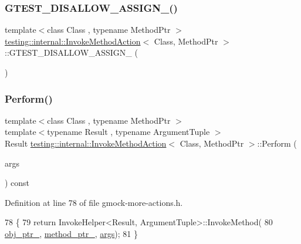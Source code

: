 \subsubsection{\texorpdfstring{G\+T\+E\+S\+T\+\_\+\+D\+I\+S\+A\+L\+L\+O\+W\+\_\+\+A\+S\+S\+I\+G\+N\+\_\+()}{GTEST\_DISALLOW\_ASSIGN\_()}}
{\footnotesize\ttfamily template$<$class Class , typename Method\+Ptr $>$ \\
\hyperlink{classtesting_1_1internal_1_1InvokeMethodAction}{testing\+::internal\+::\+Invoke\+Method\+Action}$<$ Class, Method\+Ptr $>$\+::G\+T\+E\+S\+T\+\_\+\+D\+I\+S\+A\+L\+L\+O\+W\+\_\+\+A\+S\+S\+I\+G\+N\+\_\+ (\begin{DoxyParamCaption}\item[{\hyperlink{classtesting_1_1internal_1_1InvokeMethodAction}{Invoke\+Method\+Action}$<$ Class, Method\+Ptr $>$}]{ }\end{DoxyParamCaption})\hspace{0.3cm}{\ttfamily [private]}}

\mbox{\label{classtesting_1_1internal_1_1InvokeMethodAction_aed6971c668bc2c7671d512306b25b1ab}} 
\subsubsection{\texorpdfstring{Perform()}{Perform()}}
{\footnotesize\ttfamily template$<$class Class , typename Method\+Ptr $>$ \\
template$<$typename Result , typename Argument\+Tuple $>$ \\
Result \hyperlink{classtesting_1_1internal_1_1InvokeMethodAction}{testing\+::internal\+::\+Invoke\+Method\+Action}$<$ Class, Method\+Ptr $>$\+::Perform (\begin{DoxyParamCaption}\item[{const Argument\+Tuple \&}]{args }\end{DoxyParamCaption}) const\hspace{0.3cm}{\ttfamily [inline]}}



Definition at line 78 of file gmock-\/more-\/actions.\+h.


\begin{DoxyCode}
78                                                   \{
79     \textcolor{keywordflow}{return} InvokeHelper<Result, ArgumentTuple>::InvokeMethod(
80         \hyperlink{classtesting_1_1internal_1_1InvokeMethodAction_ac857e8bad8f6417640145ab1f5740963}{obj\_ptr\_}, \hyperlink{classtesting_1_1internal_1_1InvokeMethodAction_ad87861bde8960e57a429b3cf5ba70133}{method\_ptr\_}, \hyperlink{namespacegenerate__debs_a75f9143e38df82d83b2e8a6f99cae02c}{args});
81   \}
\end{DoxyCode}


